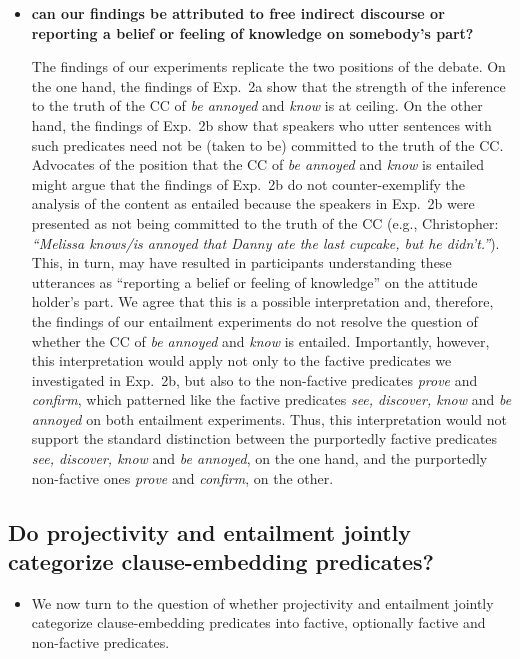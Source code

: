 \documentclass[11pt,fleqn]{article}
\newcommand{\6}{\mbox{$[\hspace*{-.6mm}[$}}
\newcommand{\9}{\mbox{$]\hspace*{-.6mm}]$}}
\begin{document}
{\begin{itemize}
\item {\bf can our findings be attributed to free indirect discourse or reporting a belief or feeling of knowledge on somebody's part?}

The findings of our experiments replicate the two positions of the debate. On the one hand, the findings of Exp.~2a show that the strength of the inference to the truth of the CC of {\em be annoyed} and {\em know} is at ceiling. On the other hand, the findings of Exp.~2b show that speakers who utter sentences with such predicates need not be (taken to be) committed to the truth of the CC. Advocates of the position that the CC of {\em be annoyed} and {\em know} is entailed might argue that the findings of Exp.~2b do not counter-exemplify the analysis of the content as entailed because the speakers in Exp.~2b were presented as not being committed to the truth of the CC (e.g., Christopher: {\em ``Melissa knows/is annoyed that Danny ate the last cupcake, but he didn't.''}). This, in turn, may have resulted in participants understanding these utterances as ``reporting a belief or feeling of knowledge'' on the attitude holder's part. We agree that this is a possible interpretation and, therefore, the findings of our entailment experiments do not resolve the question of whether the CC of {\em be annoyed} and {\em know} is entailed. Importantly, however, this interpretation would apply not only to the factive predicates we investigated in Exp.~2b, but also to the non-factive predicates {\em prove} and {\em confirm}, which patterned like the factive predicates {\em see, discover, know} and {\em be annoyed} on both entailment experiments. Thus, this interpretation would not support the standard distinction between the purportedly factive predicates {\em see, discover, know} and {\em be annoyed}, on the one hand, and the purportedly non-factive ones  {\em prove} and {\em confirm}, on the other.



\end{itemize}

\subsection{Do projectivity and entailment jointly categorize clause-embedding predicates?}

\begin{itemize}

\item We now turn to the question of whether projectivity and entailment jointly categorize clause-embedding predicates into factive, optionally factive and non-factive predicates. 


\end{itemize}}
\end{document}
